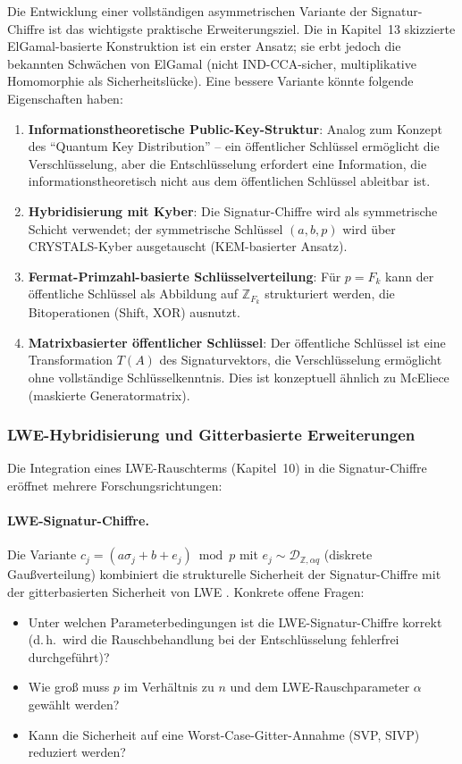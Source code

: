 ﻿\documentclass[a4paper,12pt]{scrreprt}
\theoremstyle{definition}
\begin{document}
Die Entwicklung einer vollständigen asymmetrischen Variante der Signatur-Chiffre ist das wichtigste praktische Erweiterungsziel. Die in Kapitel~13 skizzierte ElGamal-basierte Konstruktion ist ein erster Ansatz; sie erbt jedoch die bekannten Schwächen von ElGamal (nicht IND-CCA-sicher, multiplikative Homomorphie als Sicherheitslücke). Eine bessere Variante könnte folgende Eigenschaften haben:

\begin{enumerate}
  \item \textbf{Informationstheoretische Public-Key-Struktur}: Analog zum Konzept des ``Quantum Key Distribution'' -- ein öffentlicher Schlüssel ermöglicht die Verschlüsselung, aber die Entschlüsselung erfordert eine Information, die informationstheoretisch nicht aus dem öffentlichen Schlüssel ableitbar ist.
  \item \textbf{Hybridisierung mit Kyber}: Die Signatur-Chiffre wird als symmetrische Schicht verwendet; der symmetrische Schlüssel $(a,b,p)$ wird über CRYSTALS-Kyber \cite{ABD+22} ausgetauscht (KEM-basierter Ansatz).
  \item \textbf{Fermat-Primzahl-basierte Schlüsselverteilung}: Für $p = F_k$ kann der öffentliche Schlüssel als Abbildung auf $\mathbb{Z}_{F_k}$ strukturiert werden, die Bitoperationen (Shift, XOR) ausnutzt.
  \item \textbf{Matrixbasierter öffentlicher Schlüssel}: Der öffentliche Schlüssel ist eine Transformation $T(A)$ des Signaturvektors, die Verschlüsselung ermöglicht ohne vollständige Schlüsselkenntnis. Dies ist konzeptuell ähnlich zu McEliece \cite{McE78} (maskierte Generatormatrix).
\end{enumerate}

\subsubsection{LWE-Hybridisierung und Gitterbasierte Erweiterungen}

Die Integration eines LWE-Rauschterms (Kapitel~10) in die Signatur-Chiffre eröffnet mehrere Forschungsrichtungen:

\paragraph{LWE-Signatur-Chiffre.}
Die Variante $c_j = (a\sigma_j + b + e_j) \bmod p$ mit $e_j \sim \mathcal{D}_{\mathbb{Z},\alpha q}$ (diskrete Gaußverteilung) kombiniert die strukturelle Sicherheit der Signatur-Chiffre mit der gitterbasierten Sicherheit von LWE \cite{Reg05}. Konkrete offene Fragen:
\begin{itemize}
  \item Unter welchen Parameterbedingungen ist die LWE-Signatur-Chiffre korrekt (d.\,h.\ wird die Rauschbehandlung bei der Entschlüsselung fehlerfrei durchgeführt)?
  \item Wie groß muss $p$ im Verhältnis zu $n$ und dem LWE-Rauschparameter $\alpha$ gewählt werden?
  \item Kann die Sicherheit auf eine Worst-Case-Gitter-Annahme (SVP, SIVP) reduziert werden?
\end{itemize}
\end{document}
